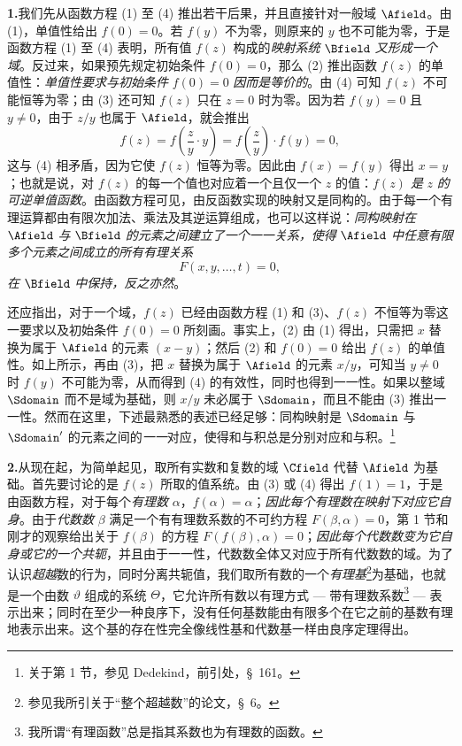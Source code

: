 \medskip
\noindent\textbf{1.}\quad 我们先从函数方程 (1) 至 (4) 推出若干后果，并且直接针对一般域 $\Afield$。由 (1)，单值性给出 $f(0)=0$。若 $f(y)$ 不为零，则原来的 $y$ 也不可能为零，于是函数方程 (1) 至 (4) 表明，所有值 $f(z)$ 构成的\emph{映射系统} $\Bfield$ \emph{又形成一个域}。反过来，如果预先规定初始条件 $f(0)=0$，那么 (2) 推出函数 $f(z)$ 的单值性：\emph{单值性要求与初始条件} $f(0)=0$ \emph{因而是等价的}。由 (4) 可知 $f(z)$ 不可能恒等为零；由 (3) 还可知 $f(z)$ 只在 $z=0$ 时为零。因为若 $f(y)=0$ 且 $y\ne0$，由于 $z/y$ 也属于 $\Afield$，就会推出
\[
f(z)=f\!\left(\frac{z}{y}\cdot y\right)=f\!\left(\frac{z}{y}\right)\cdot f(y)=0,
\]
这与 (4) 相矛盾，因为它使 $f(z)$ 恒等为零。因此由 $f(x)=f(y)$ 得出 $x=y$；也就是说，对 $f(z)$ 的每一个值也对应着一个且仅一个 $z$ 的值：\emph{$f(z)$ 是} $z$ \emph{的可逆单值函数}。由函数方程可见，由反函数实现的映射又是同构的。由于每一个有理运算都由有限次加法、乘法及其逆运算组成，也可以这样说：\emph{同构映射在} $\Afield$ \emph{与} $\Bfield$ \emph{的元素之间建立了一个一一关系，使得} $\Afield$ \emph{中任意有限多个元素之间成立的所有有理关系}
\[
F(x,y,\ldots,t)=0,
\]
\emph{在} $\Bfield$ \emph{中保持，反之亦然}。

还应指出，对于一个域，$f(z)$ 已经由函数方程 (1) 和 (3)、$f(z)$ 不恒等为零这一要求以及初始条件 $f(0)=0$ 所刻画。事实上，(2) 由 (1) 得出，只需把 $x$ 替换为属于 $\Afield$ 的元素 $(x-y)$；然后 (2) 和 $f(0)=0$ 给出 $f(z)$ 的单值性。如上所示，再由 (3)，把 $x$ 替换为属于 $\Afield$ 的元素 $x/y$，可知当 $y\ne0$ 时 $f(y)$ 不可能为零，从而得到 (4) 的有效性，同时也得到一一性。如果以整域 $\Sdomain$ 而不是域为基础，则 $x/y$ 未必属于 $\Sdomain$，而且不能由 (3) 推出一一性。然而在这里，下述最熟悉的表述已经足够：同构映射是 $\Sdomain$ 与 $\Sdomain'$ 的元素之间的\emph{一一}对应，使得和与积总是分别对应和与积。\footnote{关于第 1 节，参见 Dedekind，前引处，\S\ 161。}

\medskip
\noindent\textbf{2.}\quad 从现在起，为简单起见，取所有实数和复数的域 $\Cfield$ 代替 $\Afield$ 为基础。首先要讨论的是 $f(z)$ 所取的值系统。由 (3) 或 (4) 得出 $f(1)=1$，于是由函数方程，对于每个\emph{有理数} $\alpha$，$f(\alpha)=\alpha$；\emph{因此每个有理数在映射下对应它自身}。由于\emph{代数数} $\beta$ 满足一个有有理数系数的不可约方程 $F(\beta,\alpha)=0$，第 1 节和刚才的观察给出关于 $f(\beta)$ 的方程 $F(f(\beta),\alpha)=0$；\emph{因此每个代数数变为它自身或它的一个共轭}，并且由于一一性，代数数全体又对应于所有代数数的域。为了认识\emph{超越}数的行为，同时分离共轭值，我们取所有数的一个\emph{有理基}\footnote{参见我所引关于“整个超越数”的论文，\S\ 6。}为基础，也就是一个由数 $\vartheta$ 组成的系统 $\Theta$，它允许所有数以有理方式 --- 带有理数系数\footnote{我所谓“有理函数”总是指其系数也为有理数的函数。} --- 表示出来；同时在至少一种良序下，没有任何基数能由有限多个在它之前的基数有理地表示出来。这个基的存在性完全像线性基和代数基一样由良序定理得出。

